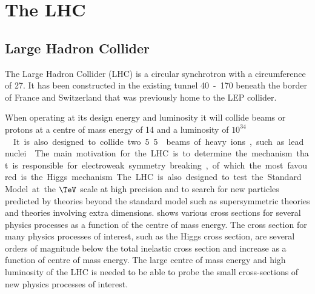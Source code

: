 \chapter{The LHC}
\label{chap:LHC}
\section{Large Hadron Collider}
The Large Hadron Collider (LHC) is a circular synchrotron with a circumference
of \unit{27}{\kilo\meter}.
It has been constructed in the existing tunnel 
\unit{40-170}{\meter} beneath the border of France and Switzerland
that was previously home to the LEP collider.

When operating at its design energy and luminosity it will collide beams or
protons at a centre of mass energy of \unit{14}{\TeV} and a luminosity of
\unit{$ 10^{34} $}{\rpsquare\cm\reciprocal\second} .
It is also designed to collide two \unit{5.5}{\TeV} beams of heavy ions, such
as lead nuclei.\cite{lhc}

The main motivation for the LHC is to determine the mechanism that is
responsible for electroweak symmetry breaking, of which the most favoured is the
Higgs mechanism.  The LHC is also designed to test the Standard Model at the
$\TeV$ scale at high precision and to search for new particles predicted by
theories beyond the standard model such as supersymmetric theories and theories
involving extra dimensions.   shows various cross
sections for several physics processes as a function of the centre of mass
energy. The cross section for many physics processes of interest, such as the
Higgs cross section, are several orders of magnitude below the total inelastic
cross section and increase as a function of centre of mass energy.  The large
centre of mass energy and high luminosity of the LHC is needed to be able to
probe the small cross-sections of new physics processes of interest.

